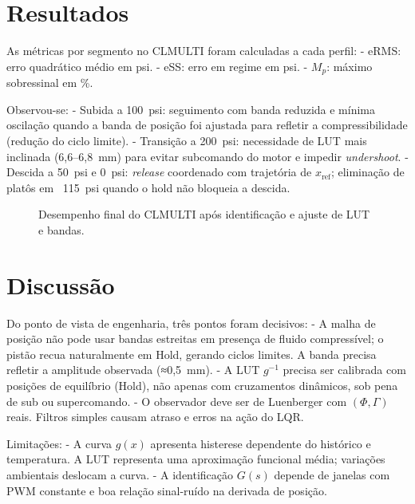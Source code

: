 \section{Resultados}
As métricas por segmento no CLMULTI foram calculadas a cada perfil:
- eRMS: erro quadrático médio em psi.
- eSS: erro em regime em psi.
- $M_p$: máximo sobressinal em \%.

Observou-se:
- Subida a 100~psi: seguimento com banda reduzida e mínima oscilação quando a banda de posição foi ajustada para refletir a compressibilidade (redução do ciclo limite).
- Transição a 200~psi: necessidade de LUT mais inclinada (6{,}6–6{,}8~mm) para evitar subcomando do motor e impedir \emph{undershoot}.
- Descida a 50~psi e 0~psi: \emph{release} coordenado com trajetória de $x_{\text{ref}}$; eliminação de platôs em ~115~psi quando o hold não bloqueia a descida.


\begin{figure}[h]
  \centering
  \caption{Desempenho final do CLMULTI após identificação e ajuste de LUT e bandas.}
  \label{fig:clmulti_final}
\end{figure}

\section{Discussão}
Do ponto de vista de engenharia, três pontos foram decisivos:
- A malha de posição não pode usar bandas estreitas em presença de fluido compressível; o pistão recua naturalmente em Hold, gerando ciclos limites. A banda precisa refletir a amplitude observada (≈0{,}5~mm).
- A LUT $g^{-1}$ precisa ser calibrada com posições de equilíbrio (Hold), não apenas com cruzamentos dinâmicos, sob pena de sub ou supercomando.
- O observador deve ser de Luenberger com $(\Phi,\Gamma)$ reais. Filtros simples causam atraso e erros na ação do LQR.

Limitações:
- A curva $g(x)$ apresenta histerese dependente do histórico e temperatura. A LUT representa uma aproximação funcional média; variações ambientais deslocam a curva.
- A identificação $G(s)$ depende de janelas com PWM constante e boa relação sinal-ruído na derivada de posição.

